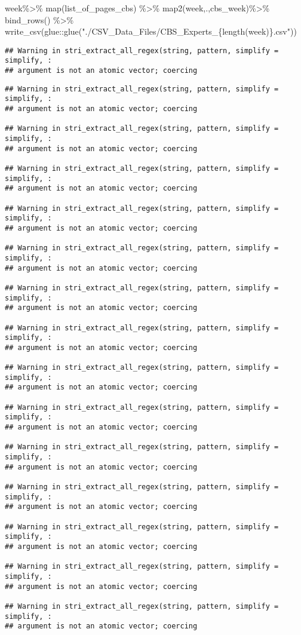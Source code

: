 \documentclass[
]{article}
\newenvironment{Shaded}{\begin{snugshade}}{\end{snugshade}}
\newcommand{\FunctionTok}[1]{\textcolor[rgb]{0.00,0.00,0.00}{#1}}
\newcommand{\NormalTok}[1]{#1}
\newcommand{\SpecialCharTok}[1]{\textcolor[rgb]{0.00,0.00,0.00}{#1}}
\newcommand{\StringTok}[1]{\textcolor[rgb]{0.31,0.60,0.02}{#1}}
\begin{document}
\begin{Shaded}
\begin{Highlighting}[]
\NormalTok{week}\SpecialCharTok{\%\textgreater{}\%}
  \FunctionTok{map}\NormalTok{(list\_of\_pages\_cbs) }\SpecialCharTok{\%\textgreater{}\%} 
  \FunctionTok{map2}\NormalTok{(week,.,cbs\_week)}\SpecialCharTok{\%\textgreater{}\%}
  \FunctionTok{bind\_rows}\NormalTok{() }\SpecialCharTok{\%\textgreater{}\%} 
  \FunctionTok{write\_csv}\NormalTok{(glue}\SpecialCharTok{::}\FunctionTok{glue}\NormalTok{(}\StringTok{"./CSV\_Data\_Files/CBS\_Experts\_\{length(week)\}.csv"}\NormalTok{))}
\end{Highlighting}
\end{Shaded}

\begin{verbatim}
## Warning in stri_extract_all_regex(string, pattern, simplify = simplify, :
## argument is not an atomic vector; coercing
\end{verbatim}

\begin{verbatim}
## Warning in stri_extract_all_regex(string, pattern, simplify = simplify, :
## argument is not an atomic vector; coercing

## Warning in stri_extract_all_regex(string, pattern, simplify = simplify, :
## argument is not an atomic vector; coercing

## Warning in stri_extract_all_regex(string, pattern, simplify = simplify, :
## argument is not an atomic vector; coercing

## Warning in stri_extract_all_regex(string, pattern, simplify = simplify, :
## argument is not an atomic vector; coercing

## Warning in stri_extract_all_regex(string, pattern, simplify = simplify, :
## argument is not an atomic vector; coercing

## Warning in stri_extract_all_regex(string, pattern, simplify = simplify, :
## argument is not an atomic vector; coercing

## Warning in stri_extract_all_regex(string, pattern, simplify = simplify, :
## argument is not an atomic vector; coercing

## Warning in stri_extract_all_regex(string, pattern, simplify = simplify, :
## argument is not an atomic vector; coercing

## Warning in stri_extract_all_regex(string, pattern, simplify = simplify, :
## argument is not an atomic vector; coercing

## Warning in stri_extract_all_regex(string, pattern, simplify = simplify, :
## argument is not an atomic vector; coercing

## Warning in stri_extract_all_regex(string, pattern, simplify = simplify, :
## argument is not an atomic vector; coercing

## Warning in stri_extract_all_regex(string, pattern, simplify = simplify, :
## argument is not an atomic vector; coercing

## Warning in stri_extract_all_regex(string, pattern, simplify = simplify, :
## argument is not an atomic vector; coercing

## Warning in stri_extract_all_regex(string, pattern, simplify = simplify, :
## argument is not an atomic vector; coercing
\end{verbatim}
\end{document}
